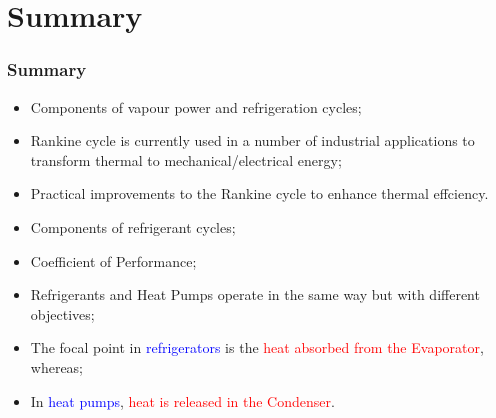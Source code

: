\documentclass[10pt,compress,handout,unknownkeysallowed]{beamer}
\begin{document}
\section{Summary}
\begin{frame}
 \frametitle{Summary}
  \begin{itemize}
   \item <1-> Components of vapour power and refrigeration cycles;
   \item <3-> Rankine cycle is currently used in a number of industrial applications to transform thermal to mechanical/electrical energy;
   \item <4-> Practical improvements to the Rankine cycle to enhance thermal effciency.
   \item <5-> Components of refrigerant cycles;
   \item <6-> Coefficient of Performance;
   \item <7-> Refrigerants and Heat Pumps operate in the same way but with different objectives;
   \item <8-> The focal point in \textcolor{blue}{refrigerators} is the \textcolor{red}{heat absorbed from the Evaporator}, whereas;
   \item <9-> In \textcolor{blue}{heat pumps}, \textcolor{red}{heat is released in the Condenser}.
  \end{itemize}
\end{frame}
\end{document}
